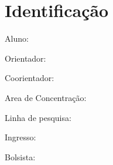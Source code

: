 \chapter{Identificação}
Aluno: \imprimirautor

Orientador: \imprimirorientador

Coorientador: \imprimircoorientador

Area de Concentração: \imprimirarea

Linha de pesquisa: \imprimirlinha

Ingresso: \imprimiringresso

Bolsista: \imprimirbolsista